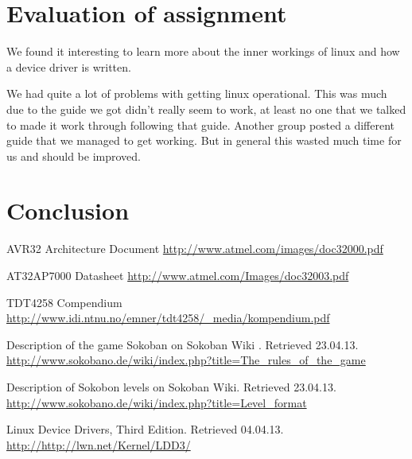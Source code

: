 \documentclass[a4paper,11pt]{article}
\begin{document}
\newpage

\section{Evaluation of assignment}

We found it interesting to learn more about the inner workings of linux and how a device driver is written. 

We had quite a lot of problems with getting linux operational. This was much due to the guide we got didn't really seem to work, at least no one that we talked to made it work through following that guide. Another group posted a different guide that we managed to get working. But in general this wasted much time for us and should be improved. 

\section{Conclusion}

\footnotesize{  %
\begin{thebibliography}{N}

 AVR32 Architecture Document
\url{http://www.atmel.com/images/doc32000.pdf}

 AT32AP7000 Datasheet
\url{http://www.atmel.com/Images/doc32003.pdf}

 TDT4258 Compendium
\url{http://www.idi.ntnu.no/emner/tdt4258/_media/kompendium.pdf}

 Description of the game Sokoban on Sokoban Wiki . Retrieved 23.04.13.
\url{http://www.sokobano.de/wiki/index.php?title=The_rules_of_the_game}

 Description of Sokobon levels on Sokoban Wiki. Retrieved 23.04.13.
\url{http://www.sokobano.de/wiki/index.php?title=Level_format}

 Linux Device Drivers, Third Edition. Retrieved 04.04.13.
\url{http://http://lwn.net/Kernel/LDD3/}



\end{thebibliography}  
}
\end{document}

